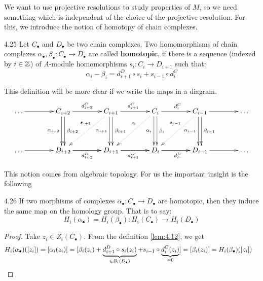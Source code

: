 \documentclass[twoside = false,	%
		headsepline,		%
		parskip = true,
		]{scrbook}						%
\begin{document}
    We want to use projective resolutions to study properties of $M$, so we need something which is independent of the choice of the projective resolution. For this, we introduce the notion of homotopy of chain complexes.

    \begin{definition}{}{4.25}
        Let $C_\bullet$ and $D_\bullet$ be two chain complexes. Two homomorphisms of chain complexes $\alpha_\bullet,\beta_\bullet: C_\bullet \to D_\bullet$ are called \textbf{homotopic}, if there is a sequence (indexed by $i \in \mathbb Z$) of $A$-module homomorphisms $s_i:C_i \to D_{i+1}$ such that:
        \begin{equation*}
            \alpha_i - \beta_i = d_{i+1}^D \circ s_i + s_{i-1} \circ d_i^C
        \end{equation*}
    \end{definition}

    This definition will be more clear if we write the maps in a diagram.
    \begin{equation*}
    \xymatrix@C=40pt @R=40pt{
        \dots \ar[r] & C_{i+2} \ar[r]^{d_{i+2}^C} \ar@<-0.5ex>[d]_{\alpha_{i+2}} \ar@<0.5ex>[d]^{\beta_{i+2}} & C_{i+1} \ar[r]^{d_{i+1}^C} \ar@<-0.5ex>[d]_{\alpha_{i+1}} \ar@<0.5ex>[d]^{\beta_{i+1}} \ar@{.>}[dl]_(.4){s_{i+1}} & C_i \ar[r]^{d_i^C} \ar@<-0.5ex>[d]_{\alpha_{i}} \ar@<0.5ex>[d]^{\beta_{i}} \ar@{.>}[dl]_(.4){s_{i}} & C_{i-1} \ar[r] \ar@<-0.5ex>[d]_{\alpha_{i-1}} \ar@<0.5ex>[d]^{\beta_{i-1}} \ar@{.>}[dl]_(.4){s_{i-1}} & \dots \\
        \dots \ar[r] & D_{i+2} \ar[r]\ar[r]_{d_{i+2}^D} & D_{i+1} \ar[r]\ar[r]_{d_{i+1}^D} & D_i \ar[r]\ar[r]_{d_{i}^D} & D_{i-1} \ar[r] & \dots
    }
    \end{equation*}

    This notion comes from algebraic topology. For us the important insight is the following

    \begin{lemma}{}{4.26}
        If two morphisms of complexes $\alpha_\bullet: C_\bullet \to D_\bullet$ are homotopic, then they induce the same map on the homology group. That is to say:
        \begin{equation*}
            H_i(\alpha_\bullet) = H_i(\beta_\bullet): H_i(C_\bullet) \to H_i(D_\bullet)
        \end{equation*}
    \end{lemma}

    \begin{proof}
        Take $z_i \in Z_i(C_\bullet)$. From the definition \ref{lem:4.12}, we get
        \begin{equation*}
        \begin{split}
            H_i(\alpha_\bullet)([z_i]) &= \left[ \alpha_i(z_i)\right] = [\beta_i(z_i) + \underbrace{d_{i+1}^D \circ s_i(z_i)}_{\in B_i(D_\bullet)} + s_{i-1} \circ \underbrace{d_i^C(z_i)}_{=0}] = [\beta_i(z_i)] = H_i(\beta_\bullet)([z_i])
        \end{split}
        \end{equation*}
    \end{proof}
\end{document}
